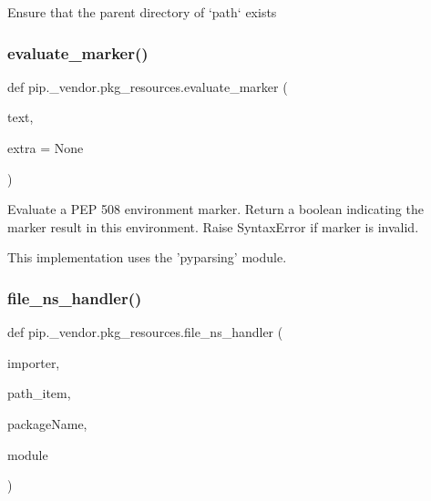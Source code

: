 \begin{DoxyVerb}Ensure that the parent directory of `path` exists\end{DoxyVerb}
 \mbox{\label{namespacepip_1_1__vendor_1_1pkg__resources_a8ceda07b502eb64c69b1dd9c1ceaae91}} 
\subsubsection{\texorpdfstring{evaluate\+\_\+marker()}{evaluate\_marker()}}
{\footnotesize\ttfamily def pip.\+\_\+vendor.\+pkg\+\_\+resources.\+evaluate\+\_\+marker (\begin{DoxyParamCaption}\item[{}]{text,  }\item[{}]{extra = {\ttfamily None} }\end{DoxyParamCaption})}

\begin{DoxyVerb}Evaluate a PEP 508 environment marker.
Return a boolean indicating the marker result in this environment.
Raise SyntaxError if marker is invalid.

This implementation uses the 'pyparsing' module.
\end{DoxyVerb}
 \mbox{\label{namespacepip_1_1__vendor_1_1pkg__resources_ad9ea4af0c123ef5cdf9a04ee41307d49}} 
\subsubsection{\texorpdfstring{file\+\_\+ns\+\_\+handler()}{file\_ns\_handler()}}
{\footnotesize\ttfamily def pip.\+\_\+vendor.\+pkg\+\_\+resources.\+file\+\_\+ns\+\_\+handler (\begin{DoxyParamCaption}\item[{}]{importer,  }\item[{}]{path\+\_\+item,  }\item[{}]{package\+Name,  }\item[{}]{module }\end{DoxyParamCaption})}

